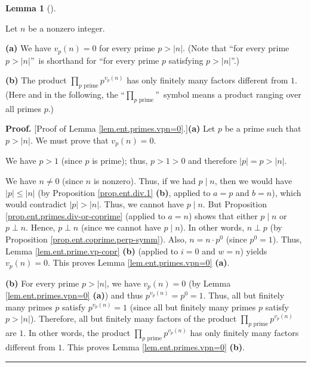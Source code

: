 \documentclass[numbers=enddot,12pt,final,onecolumn,notitlepage]{scrartcl}%
\numberwithin{exer}{subsection}
\theoremstyle{definition}
\newtheorem{lem}[theo]{Lemma}
\newenvironment{lemma}[1][]
{\begin{lem}[#1]\begin{leftbar}}
{\end{leftbar}\end{lem}}
\newenvironment{proof}[1][Proof]{\noindent\textbf{#1.} }{\ \rule{0.5em}{0.5em}}
\let\prodnonlimits\prod
\renewcommand{\prod}{\prodnonlimits\limits}
\begin{document}
\begin{lemma}
\label{lem.ent.primes.vpn=0}Let $n$ be a nonzero integer.

\textbf{(a)} We have $v_{p}\left(  n\right)  =0$ for every prime $p>\left\vert
n\right\vert $. (Note that \textquotedblleft for every prime $p>\left\vert
n\right\vert $\textquotedblright\ is shorthand for \textquotedblleft for every
prime $p$ satisfying $p>\left\vert n\right\vert $\textquotedblright.)

\textbf{(b)} The product $\prod_{p\text{ prime}}p^{v_{p}\left(  n\right)  }$
has only finitely many factors different from $1$. (Here and in the following,
the \textquotedblleft$\prod_{p\text{ prime}}$\textquotedblright\ symbol means
a product ranging over all primes $p$.)
\end{lemma}

\begin{proof}
[Proof of Lemma \ref{lem.ent.primes.vpn=0}.]\textbf{(a)} Let $p$ be a prime
such that $p>\left\vert n\right\vert $. We must prove that $v_{p}\left(
n\right)  =0$.

We have $p>1$ (since $p$ is prime); thus, $p>1>0$ and therefore $\left\vert
p\right\vert =p>\left\vert n\right\vert $.

We have $n\neq0$ (since $n$ is nonzero). Thus, if we had $p\mid n$, then we
would have $\left\vert p\right\vert \leq\left\vert n\right\vert $ (by
Proposition \ref{prop.ent.div.1} \textbf{(b)}, applied to $a=p$ and $b=n$),
which would contradict $\left\vert p\right\vert >\left\vert n\right\vert $.
Thus, we cannot have $p\mid n$. But Proposition
\ref{prop.ent.primes.div-or-coprime} (applied to $a=n$) shows that either
$p\mid n$ or $p\perp n$. Hence, $p\perp n$ (since we cannot have $p\mid n$).
In other words, $n\perp p$ (by Proposition \ref{prop.ent.coprime.perp-symm}).
Also, $n=n\cdot p^{0}$ (since $p^{0}=1$). Thus, Lemma
\ref{lem.ent.prime.vp-copr} \textbf{(b)} (applied to $i=0$ and $w=n$) yields
$v_{p}\left(  n\right)  =0$. This proves Lemma \ref{lem.ent.primes.vpn=0}
\textbf{(a)}.

\textbf{(b)} For every prime $p>\left\vert n\right\vert $, we have
$v_{p}\left(  n\right)  =0$ (by Lemma \ref{lem.ent.primes.vpn=0} \textbf{(a)})
and thus $p^{v_{p}\left(  n\right)  }=p^{0}=1$. Thus, all but finitely many
primes $p$ satisfy $p^{v_{p}\left(  n\right)  }=1$ (since all but finitely
many primes $p$ satisfy $p>\left\vert n\right\vert $). Therefore, all but
finitely many factors of the product $\prod_{p\text{ prime}}p^{v_{p}\left(
n\right)  }$ are $1$. In other words, the product $\prod_{p\text{ prime}%
}p^{v_{p}\left(  n\right)  }$ has only finitely many factors different from
$1$. This proves Lemma \ref{lem.ent.primes.vpn=0} \textbf{(b)}.
\end{proof}
\end{document}
